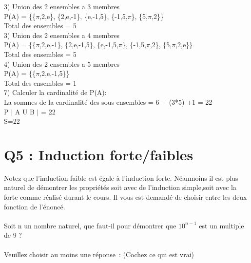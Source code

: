 3) Union des 2 ensembles a 3 membres \\

P(A) = \{\{$\pi$,2,e\}, \{2,e,-1\}, \{e,-1,5\}, \{-1,5,$\pi$\}, \{5,$\pi$,2\}\} \\

Total des ensembles = 5 \\

3) Union des 2 ensembles a 4 membres \\

P(A) = \{\{$\pi$,2,e,-1\}, \{2,e,-1,5\}, \{e,-1,5,$\pi$\}, \{-1,5,$\pi$,2\}, \{5,$\pi$,2,e\}\} \\

Total des ensembles = 5 \\

4) Union des 2 ensembles a 5 membres \\

P(A) = \{\{$\pi$,2,e,-1,5\}\} \\

Total des ensembles = 1 \\

7) Calculer la cardinalité de P(A):\\

La sommes de la cardinalité des sous ensembles = 6 + (3*5) +1 = 22\\

P $|$ A U B $|$ = 22 \\

S=22 \\


\newpage
\section{Q5 : Induction forte/faibles}

\vspace{5mm} %

Notez que l’induction faible est égale à l’induction forte. Néanmoins il est plus naturel de démontrer les propriétés soit avec de l’induction simple,soit avec la forte comme réalisé durant le cours. Il vous est demandé de choisir entre les deux fonction de l’énoncé.\\ \\
Soit n un nombre naturel, que faut-il pour démontrer que $10^{n-1}$ est un multiple de 9 ? \\ \\
Veuillez choisir au moins une réponse : (Cochez ce qui est vrai)\\

